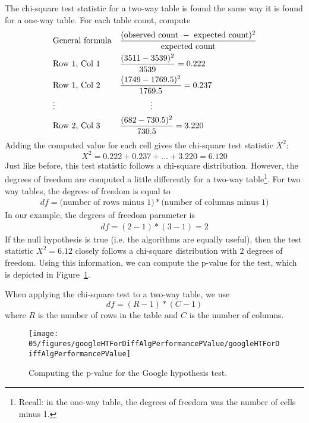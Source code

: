 The chi-square test statistic for a two-way table is found the same way it is found for a one-way table. For each table count, compute
\begin{align*}
&\text{General formula}& &\frac{(\text{observed count } - \text{ expected count})^2}{\text{expected count}} \\
&\text{Row 1, Col 1}& &\frac{(3511 - 3539)^2}{3539} = 0.222 \\
&\text{Row 1, Col 2}& &\frac{(1749 - 1769.5)^2}{1769.5} = 0.237 \\
& \vdots & &\hspace{13mm}\vdots \\
&\text{Row 2, Col 3}& &\frac{(682 - 730.5)^2}{730.5} = 3.220
\end{align*}
Adding the computed value for each cell gives the chi-square test statistic $X^2$:
$$X^2 = 0.222 + 0.237 + \dots + 3.220 = 6.120$$
Just like before, this test statistic follows a chi-square distribution. However, the degrees of freedom are computed a little differently for a two-way table\footnote{Recall: in the one-way table, the degrees of freedom was the number of cells minus 1.}. For two way tables, the degrees of freedom is equal to
\begin{align*}
df = \text{(number of rows minus 1)}*\text{(number of columns minus 1)}
\end{align*}
In our example, the degrees of freedom parameter is
\begin{align*}
df = (2-1)*(3-1) = 2
\end{align*}
If the null hypothesis is true (i.e. the algorithms are equally useful), then the test statistic $X^2 = 6.12$ closely follows a chi-square distribution with 2 degrees of freedom. Using this information, we can compute the p-value for the test, which is depicted in Figure~\ref{googleHTForDiffAlgPerformancePValue}.

\begin{termBox}{
When applying the chi-square test to a two-way table, we use
$$ df = (R-1)*(C-1) $$
where $R$ is the number of rows in the table and $C$ is the number of columns.}
\end{termBox}

\begin{figure}[h]
\centering
\texttt{[image: 05/figures/googleHTForDiffAlgPerformancePValue/googleHTForDiffAlgPerformancePValue]}
\caption{Computing the p-value for the Google hypothesis test.}
\label{googleHTForDiffAlgPerformancePValue}
\end{figure}

